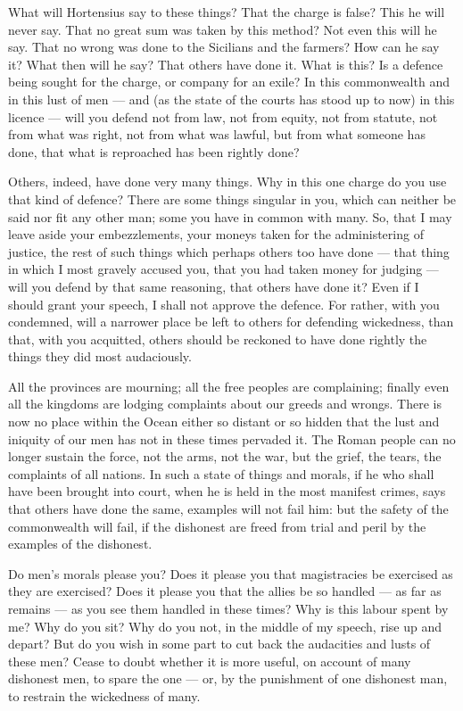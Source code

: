  What will Hortensius say to these things? That the charge is false? This he will never say. That no great sum was taken by this method? Not even this will he say. That no wrong was done to the Sicilians and the farmers? How can he say it? What then will he say? That others have done it. What is this? Is a defence being sought for the charge, or company for an exile? In this commonwealth and in this lust of men --- and (as the state of the courts has stood up to now) in this licence --- will you defend not from law, not from equity, not from statute, not from what was right, not from what was lawful, but from what someone has done, that what is reproached has been rightly done?

 Others, indeed, have done very many things. Why in this one charge do you use that kind of defence? There are some things singular in you, which can neither be said nor fit any other man; some you have in common with many. So, that I may leave aside your embezzlements, your moneys taken for the administering of justice, the rest of such things which perhaps others too have done --- that thing in which I most gravely accused you, that you had taken money for judging --- will you defend by that same reasoning, that others have done it? Even if I should grant your speech, I shall not approve the defence. For rather, with you condemned, will a narrower place be left to others for defending wickedness, than that, with you acquitted, others should be reckoned to have done rightly the things they did most audaciously.

 All the provinces are mourning; all the free peoples are complaining; finally even all the kingdoms are lodging complaints about our greeds and wrongs. There is now no place within the Ocean either so distant or so hidden that the lust and iniquity of our men has not in these times pervaded it. The Roman people can no longer sustain the force, not the arms, not the war, but the grief, the tears, the complaints of all nations. In such a state of things and morals, if he who shall have been brought into court, when he is held in the most manifest crimes, says that others have done the same, examples will not fail him: but the safety of the commonwealth will fail, if the dishonest are freed from trial and peril by the examples of the dishonest.

 Do men's morals please you? Does it please you that magistracies be exercised as they are exercised? Does it please you that the allies be so handled --- as far as remains --- as you see them handled in these times? Why is this labour spent by me? Why do you sit? Why do you not, in the middle of my speech, rise up and depart? But do you wish in some part to cut back the audacities and lusts of these men? Cease to doubt whether it is more useful, on account of many dishonest men, to spare the one --- or, by the punishment of one dishonest man, to restrain the wickedness of many.

